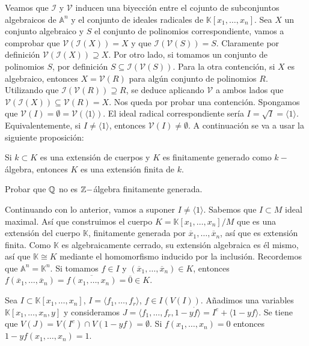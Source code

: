 \documentclass[ACGA.tex]{subfiles}
\begin{document}
Veamos que $\mathcal{I}$ y $\mathcal{V}$ inducen una biyección entre el cojunto de subconjuntos algebraicos de $\mathbb{A}^n$ y el conjunto de ideales radicales de $\mathbb{K}[x_1,\dots,x_n]$. Sea $X$ un conjunto algebraico y $S$ el conjunto de polinomios correspondiente, vamos a comprobar que $\mathcal{V}(\mathcal{I}(X))=X$ y que $\mathcal{I}(\mathcal{V}(S))=S$. Claramente por definición $\mathcal{V}(\mathcal{I}(X))\supseteq X$. Por otro lado, si tomamos un conjunto de polinomios $S$, por definición $S\subseteq \mathcal{I}(\mathcal{V}(S))$. Para la otra contención, si $X$ es algebraico, entonces $X=\mathcal{V}(R)$ para algún conjunto de polinomios $R$. Utilizando que $\mathcal{I}(\mathcal{V}(R))\supseteq R$, se deduce aplicando $\mathcal{V}$ a ambos lados que $\mathcal{V}(\mathcal{I}(X))\subseteq \mathcal{V}(R)=X$. Nos queda por probar una contención. Spongamos que $\mathcal{V}(I)=\emptyset=\mathcal{V}(\langle 1\rangle)$. El ideal radical correspondiente sería $I=\sqrt{I}=\langle1 \rangle$. Equivalentemente, si $I\neq\langle 1\rangle$, entonces $\mathcal{V}(I)\neq\emptyset$. A continuación se va a usar la siguiente proposición:
\begin{prop}
Si $k\subset K$ es una extensión de cuerpos y $K$ es finitamente generado como $k-$álgebra, entonces $K$ es una extensión finita de $k$. 
\end{prop}

\begin{ejer}
Probar que $\mathbb{Q}$ no es $\mathbb{Z}-$álgebra finitamente generada. 
\end{ejer}

Continuando con lo anterior, vamos a suponer $I\neq\langle 1\rangle$. Sabemos que $I\subset M$ ideal maximal. Así que construimos el cuerpo $K=\mathbb{K}[x_1,\dots,x_n]/M$ que es una extensión del cuerpo $\mathbb{K}$, finitamente generada por $\overline{x}_1,\dots, \overline{x}_n$, así que es extensión finita. Como $\mathbb{K}$ es algebraicamente cerrado, su extensión algebraica es él mismo, así que $\mathbb{K}\cong K$ mediante el homomorfismo inducido por la inclusión. Recordemos que $\mathbb{A}^n=\mathbb{K}^n$. Si tomamos $f\in I$ y $(\overline{x}_1,\dots, \overline{x}_n)\in K$, entonces $f(\overline{x}_1,\dots, \overline{x}_n)=\overline{f(x_1,\dots,x_n)}=\overline{0}\in K$. 

Sea $I\subset \mathbb{K}[x_1,\dotsc,x_n]$, $I=\langle f_1,\dotsc,f_r\rangle$, $f\in I(V(I))$. Añadimos una variables $\mathbb{K}[x_1,\dotsc,x_n,y]$ y consideramos $J=\langle f_1,\dotsc,f_r,1-y\dot f\rangle = I^e + \langle 1-yf\rangle$. Se tiene que $V(J) = V(I^e) \cap V(1-yf)=\emptyset$. Si $f(x_1,\dotsc,x_n)=0$ entonces $1-yf(x_1,\dotsc,x_n) = 1$. 
\end{document}
